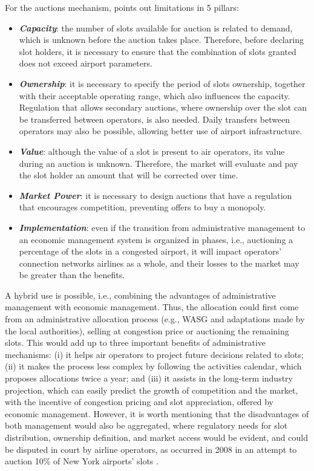 For the auctions mechanism, \cite{ball2006auctions} points out limitations in 5 pillars:
\begin{itemize}
\item \textbf{\textit{Capacity}}: the number of slots available for auction is related to demand, which is unknown before the auction takes place. Therefore, before declaring slot holders, it is necessary to ensure that the combination of slots granted does not exceed airport parameters.
\item \textit{\textbf{Ownership}}: it is necessary to specify the period of slots ownership, together with their acceptable operating range, which also influences the capacity. Regulation that allows secondary auctions, where ownership over the slot can be transferred between operators, is also needed. Daily transfers between operators may also be possible, allowing better use of airport infrastructure.
\item \textbf{\textit{Value}}: although the value of a slot is present to air operators, its value during an auction is unknown. Therefore, the market will evaluate and pay the slot holder an amount that will be corrected over time.
\item \textbf{\textit{Market Power}}: it is necessary to design auctions that have a regulation that encourages competition, preventing offers to buy a monopoly.
\item \textbf{\textit{Implementation}}: even if the transition from administrative management to an economic management system is organized in phases, i.e., auctioning a percentage of the slots in a congested airport, it will impact operators' connection networks airlines as a whole, and their losses to the market may be greater than the benefits.
\end{itemize}

A hybrid use is possible, i.e., combining the advantages of administrative management with economic management. Thus, the allocation could first come from an administrative allocation process (e.g., \acrshort{WASG} and adaptations made by the local authorities), selling at congestion price or auctioning the remaining slots. This would add up to three important benefits of administrative mechanisms: (i) it helps air operators to project future decisions related to slots; (ii) it makes the process less complex by following the activities calendar, which proposes allocations twice a year; and (iii) it assists in the long-term industry projection, which can easily predict the growth of competition and the market, with the incentive of congestion pricing and slot appreciation, offered by economic management. However, it is worth mentioning that the disadvantages of both management would also be aggregated, where regulatory needs for slot distribution, ownership definition, and market access would be evident, and could be disputed in court by airline operators, as occurred in 2008 in an attempt to auction 10\% of New York airports’ slots \cite{cavusoglu2021minimum, gillen2016airport, BichlerAuction2022}.

